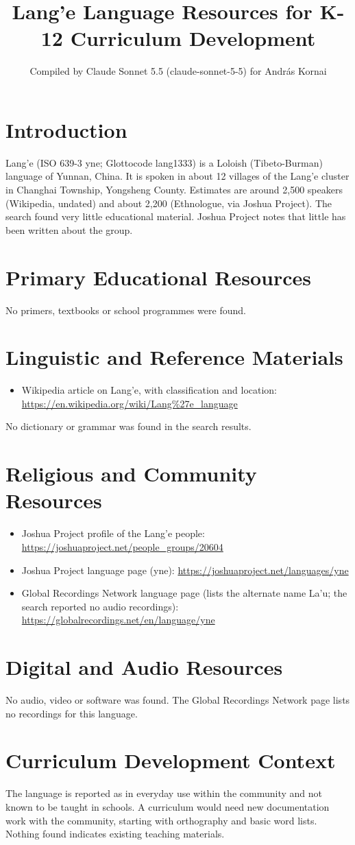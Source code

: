 \documentclass[12pt]{article}
\title{Lang'e Language Resources for K-12 Curriculum Development}
\author{Compiled by Claude Sonnet 5.5 (claude-sonnet-5-5) for Andr\'as Kornai}
\date{}
\begin{document}
\maketitle

\section{Introduction}
Lang'e (ISO 639-3 yne; Glottocode lang1333) is a Loloish (Tibeto-Burman) language of Yunnan, China. It is spoken in about 12 villages of the Lang'e cluster in Changhai Township, Yongsheng County. Estimates are around 2,500 speakers (Wikipedia, undated) and about 2,200 (Ethnologue, via Joshua Project). The search found very little educational material. Joshua Project notes that little has been written about the group.

\section{Primary Educational Resources}
No primers, textbooks or school programmes were found.

\section{Linguistic and Reference Materials}
\begin{itemize}
\item Wikipedia article on Lang'e, with classification and location: \url{https://en.wikipedia.org/wiki/Lang%27e_language}
\end{itemize}
No dictionary or grammar was found in the search results.

\section{Religious and Community Resources}
\begin{itemize}
\item Joshua Project profile of the Lang'e people: \url{https://joshuaproject.net/people_groups/20604}
\item Joshua Project language page (yne): \url{https://joshuaproject.net/languages/yne}
\item Global Recordings Network language page (lists the alternate name La'u; the search reported no audio recordings): \url{https://globalrecordings.net/en/language/yne}
\end{itemize}

\section{Digital and Audio Resources}
No audio, video or software was found. The Global Recordings Network page lists no recordings for this language.

\section{Curriculum Development Context}
The language is reported as in everyday use within the community and not known to be taught in schools. A curriculum would need new documentation work with the community, starting with orthography and basic word lists. Nothing found indicates existing teaching materials.
\end{document}
